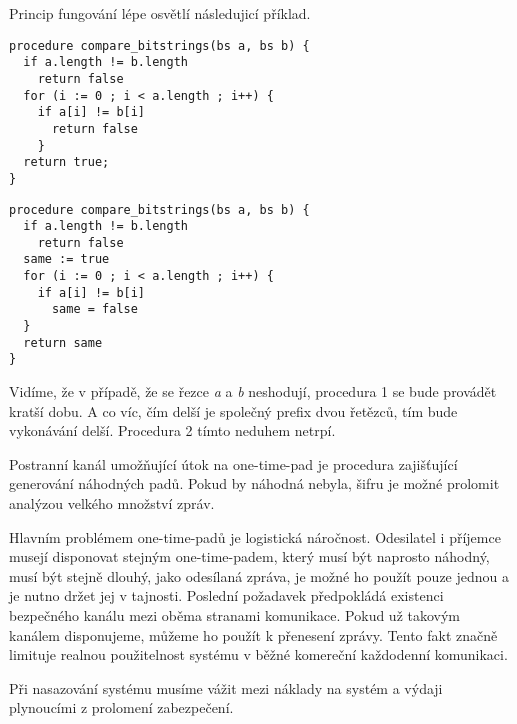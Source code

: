\documentclass[12pt,draft]{article}
\begin{document}
Princip fungování lépe osvětlí následujicí příklad.

\begin{lstlisting}
procedure compare_bitstrings(bs a, bs b) {
  if a.length != b.length
    return false
  for (i := 0 ; i < a.length ; i++) {
    if a[i] != b[i]
      return false
    }
  return true;
}
\end{lstlisting}

\begin{lstlisting}
procedure compare_bitstrings(bs a, bs b) {
  if a.length != b.length
    return false
  same := true
  for (i := 0 ; i < a.length ; i++) {
    if a[i] != b[i]
      same = false
  }
  return same
}  
\end{lstlisting}

Vidíme, že v případě, že se řezce \textit{a} a \textit{b} neshodují, procedura 1 se bude provádět kratší dobu. A co víc, čím delší je společný prefix dvou řetězců, tím bude vykonávání delší. Procedura 2 tímto neduhem netrpí.

Postranní kanál umožňující útok na \foreignlanguage{english}{one-time-pad} je procedura zajišťující generování náhodných padů. Pokud by náhodná nebyla, šifru je možné prolomit analýzou velkého množství zpráv.

Hlavním problémem one-time-padů je logistická náročnost. Odesilatel i příjemce musejí disponovat stejným one-time-padem, který musí být naprosto náhodný, musí být stejně dlouhý, jako odesílaná zpráva, je možné ho použít pouze jednou a je nutno držet jej v tajnosti. Poslední požadavek předpokládá existenci bezpečného kanálu mezi oběma stranami komunikace. Pokud už takovým kanálem disponujeme, můžeme ho použít k přenesení zprávy.
Tento fakt značně limituje realnou použitelnost systému v běžné komereční každodenní  komunikaci.

Při nasazování systému musíme vážit mezi náklady na systém a výdaji plynoucími z prolomení zabezpečení.



\end{document}
